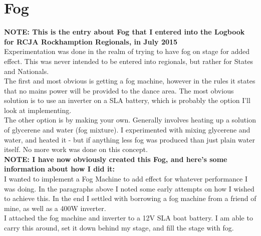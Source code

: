 		\chapter{Fog}
			\textbf{NOTE: This is the entry about Fog that I entered into the Logbook for RCJA Rockhamption Regionals, in July 2015}\\
			
			Experimentation was done in the realm of trying to have fog on stage for added effect. This was never intended to be entered into regionals, but rather for States and Nationals.	\\				
			
			The first and most obvious is getting a fog machine, however in the rules it states that no mains power will be provided to the dance area. The most obvious solution is to use an inverter on a SLA battery, which is probably the option I'll look at implementing.\\
			
			The other option is by making your own. Generally involves heating up a solution of glycerene and water (fog mixture). I experimented with mixing glycerene and water, and heated it - but if anything less fog was produced than just plain water itself. No more work was done on this concept.\\
			
			\textbf{NOTE: I have now obviously created this Fog, and here's some information about how I did it:}\\
			
			I wanted to implement a Fog Machine to add effect for whatever performance I was doing. In the paragraphs above I noted some early attempts on how I wished to achieve this. In the end I settled with borrowing a fog machine from a friend of mine, as well as a 400W inverter.\\
			
			I attached the fog machine and inverter to a 12V SLA boat battery. I am able to carry this around, set it down behind my stage, and fill the stage with fog.\\
			
